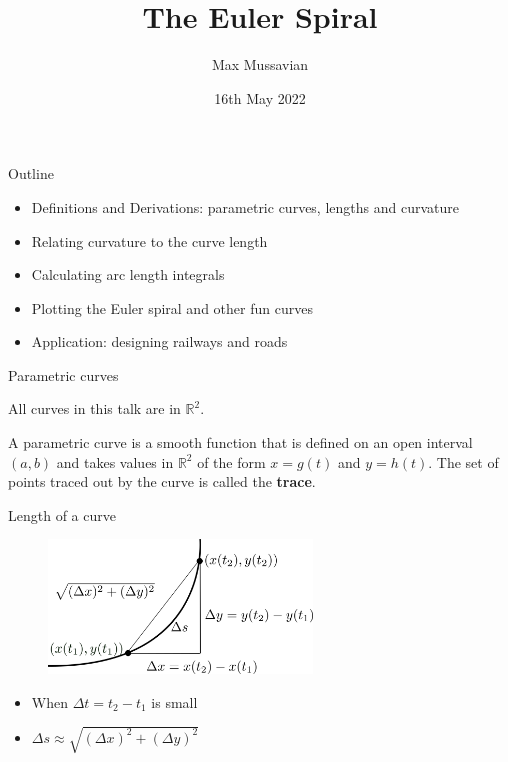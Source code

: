 \documentclass{beamer}
\title{The Euler Spiral}
\author{Max Mussavian}
\date[2022]{16th May 2022}
\begin{document}
\begin{frame}[plain]
    \maketitle
\end{frame}
\begin{frame}{Outline}
	\begin{itemize}
		\item Definitions and Derivations: parametric curves, lengths and curvature
		\item Relating curvature to the curve length
		\item Calculating arc length integrals
		\item Plotting the Euler spiral and other fun curves
		\item Application: designing railways and roads
	\end{itemize}
\end{frame}


\begin{frame}{Parametric curves}
	
		All curves in this talk are in $\mathbb{R}^2$.
		\begin{definition}
			A parametric curve is a smooth function that is defined on an open interval $(a, b)$ and takes values in $\mathbb{R}^2$ of the form $x = g(t)$ and $y=h(t)$.
			\newline
			The set of points traced out by the curve is called the \textbf{trace}.
		\end{definition}
\end{frame}

\begin{frame}{Length of a curve}
	\begin{figure}
	\centering
	\includegraphics[width=70mm, scale=0.4]{curve_length_2.png}
	\end{figure}
	\begin{itemize}
	\item When $\Delta t = t_2 - t_1$ is small
	\item $\Delta s \approx	\sqrt{\left(\Delta x\right)^2 + \left(\Delta y\right)^2} $
	\end{itemize}
\end{frame}
\end{document}
